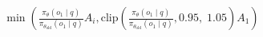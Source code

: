 \documentclass[preview]{standalone}
\begin{document}
\begin{align*}
\min \left(\frac{\pi_\theta(o_1 \mid q)}{\pi_{\theta_{\text{old}}}(o_1 \mid q)} A_i, \text{clip} \left( \frac{\pi_\theta(o_1 \mid q)}{\pi_{\theta_{\text{old}}}(o_1 \mid q)}, 0.95,\; 1.05 \right) A_1 \right)
\end{align*}
\end{document}
